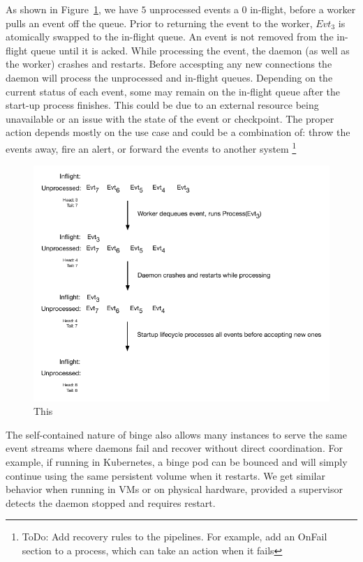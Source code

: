 \documentclass[10pt,twocolumn]{article}
\begin{document}
As shown in Figure~\ref{fig:durable-queue}, we have $5$ unprocessed events a
$0$ in-flight, before a worker pulls an event off the queue.  Prior to
returning the event to the worker, $Evt_{3}$ is atomically swapped to the
in-flight queue.  An event is not removed from the in-flight queue until it is
acked.  While processing the event, the daemon (as well as the worker) crashes
and restarts.  Before accespting any new connections the daemon will process
the unprocessed and in-flight queues.  Depending on the current status of each
event, some may remain on the in-flight queue after the start-up process
finishes.  This could be due to an external resource being unavailable or an
issue with the state of the event or checkpoint.  The proper action depends
mostly on the use case and could be a combination of: throw the events away,
fire an alert, or forward the events to another system \footnote{ToDo: Add
recovery rules to the pipelines.  For example, add an OnFail section to a
process, which can take an action when it fails}

\begin{figure}[h]
\centering
\includegraphics[scale=0.60]{figures/durable-queue.pdf}
\caption{This}
\label{fig:durable-queue}
\end{figure}

The self-contained nature of binge also allows many instances to serve the same
event streams where daemons fail and recover without direct coordination.  For
example, if running in Kubernetes, a binge pod can be bounced and will simply
continue using the same persistent volume when it restarts.  We get similar
behavior when running in VMs or on physical hardware, provided a supervisor
detects the daemon stopped and requires restart.
\end{document}
